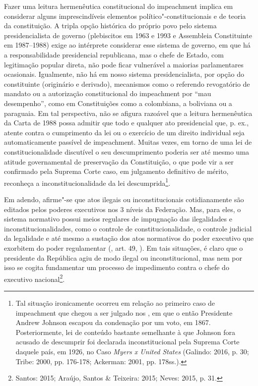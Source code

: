 Fazer uma leitura hermenêutica constitucional do impeachment
implica em considerar alguns imprescindíveis elementos
político"-constitucionais e de teoria da constituição. A tripla opção
histórica do próprio povo pelo sistema presidencialista de governo
(plebiscitos em 1963 e 1993 e Assembleia Constituinte em 1987--1988)
exige ao intérprete considerar esse sistema de governo, em que há a
responsabilidade presidencial republicana, mas o chefe de Estado, com
legitimação popular direta, não pode ficar vulnerável a maiorias
parlamentares ocasionais. Igualmente, não há em nosso sistema
presidencialista, por opção do constituinte (originário e derivado),
mecanismos como o referendo revogatório de mandato ou a autorização
constitucional do impeachment por ``mau desempenho'', como em
Constituições como a colombiana, a boliviana ou a paraguaia. Em tal
perspectiva, não se afigura razoável que a leitura hermenêutica da Carta
de 1988 possa admitir que todo e qualquer ato presidencial que, p. ex.,
atente contra o cumprimento da lei ou o exercício de um direito
individual seja automaticamente passível de impeachment. Muitas
vezes, em torno de uma lei de constitucionalidade discutível o seu
descumprimento poderia ser até mesmo uma atitude governamental de
preservação da Constituição, o que pode vir a ser confirmado pela
Suprema Corte caso, em julgamento definitivo de mérito, reconheça a
inconstitucionalidade da lei descumprida\footnote{Tal situação
  ironicamente ocorreu em relação ao primeiro caso de impeachment
  que chegou a ser julgado nos , em que o então Presidente Andrew
  Johnson escapou da condenação por um voto, em 1867. Posteriormente,
  lei de conteúdo bastante semelhante à que Johnson fora acusado de
  descumprir foi declarada inconstitucional pela Suprema Corte daquele
  país, em 1926, no Caso \emph{Myers x United States} (Galindo: 2016, p.
  30; Tribe: 2000, pp. 176-178; Ackerman: 2001, pp. 178ss.).}.

Em adendo, afirme"-se que atos ilegais ou inconstitucionais
cotidianamente são editados pelos poderes executivos nos 3 níveis da
Federação. Mas, para eles, o sistema normativo possui meios regulares de
impugnação das ilegalidades e inconstitucionalidades, como o controle de
constitucionalidade, o controle judicial da legalidade e até mesmo a
sustação dos atos normativos do poder executivo que exorbitem do poder
regulamentar (, art. 49, ). Em tais situações, é claro que o
presidente da República agiu de modo ilegal ou inconstitucional, mas nem
por isso se cogita fundamentar um processo de impedimento contra o chefe
do executivo nacional\footnote{Santos: 2015; Araújo, Santos \& Teixeira: 2015;
Neves: 2015, p. 31.}.

